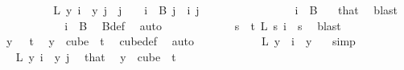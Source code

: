 \begin{isabellebody}
\isanewline
\isanewline
\ \ \ \ \ \ \isamarkupfalse%
\ \isamarkupfalse%
\ {\isachardoublequoteopen}{\isacharparenleft}{\kern0pt}{\isacharquery}{\kern0pt}L\ y{\isacharparenright}{\kern0pt}\ i\ {\isacharequal}{\kern0pt}\ y\ j{\isachardoublequoteclose}\ \ {\isachardoublequoteopen}j\ {\isacharless}{\kern0pt}\ {}{\isachardoublequoteclose}\ \ {\isachardoublequoteopen}i\ {\isasymin}\ B\ j{\isachardoublequoteclose}\ \ i\ j\isanewline
\ \ \ \ \ \ \isamarkupfalse%
{\isacharminus}{\kern0pt}\isanewline
\ \ \ \ \ \ \ \ \isamarkupfalse%
\ {\isachardoublequoteopen}i\ {\isasymin}\ B\ {}{\isachardoublequoteclose}\ \isamarkupfalse%
\ that\ \isamarkupfalse%
\ blast\isanewline
\ \ \ \ \ \ \ \ \isamarkupfalse%
\ \isamarkupfalse%
\ {\isachardoublequoteopen}i\ {\isasymin}\ {\isacharquery}{\kern0pt}B{}{\isachardoublequoteclose}\ \isamarkupfalse%
\ B{\isacharunderscore}{\kern0pt}def\ \isamarkupfalse%
\ auto\ \isanewline
\ \ \ \ \ \ \ \ \isamarkupfalse%
\ \isamarkupfalse%
\ {\isachardoublequoteopen}{\isacharparenleft}{\kern0pt}{\isasymforall}s\ {\isacharless}{\kern0pt}\ t{\isachardot}{\kern0pt}\ L\ s\ i\ {\isacharequal}{\kern0pt}\ s{\isacharparenright}{\kern0pt}{\isachardoublequoteclose}\ \isamarkupfalse%
\ blast\isanewline
\ \ \ \ \ \ \ \ \isamarkupfalse%
\ \isamarkupfalse%
\ {\isachardoublequoteopen}y\ {}\ {\isacharless}{\kern0pt}\ t{\isachardoublequoteclose}\ \isamarkupfalse%
\ {\isacartoucheopen}y\ {\isasymin}\ cube\ {}\ t{\isacartoucheclose}\ \isamarkupfalse%
\ cube{\isacharunderscore}{\kern0pt}def\ \isamarkupfalse%
\ auto\isanewline
\ \ \ \ \ \ \ \ \isamarkupfalse%
\ \isamarkupfalse%
\ {\isachardoublequoteopen}L\ {\isacharparenleft}{\kern0pt}y\ {}{\isacharparenright}{\kern0pt}\ i\ {\isacharequal}{\kern0pt}\ y\ {}{\isachardoublequoteclose}\ \isamarkupfalse%
\ simp\isanewline
\ \ \ \ \ \ \ \ \isamarkupfalse%
\ \isamarkupfalse%
\ {\isachardoublequoteopen}{\isacharquery}{\kern0pt}L\ y\ i\ {\isacharequal}{\kern0pt}\ y\ j{\isachardoublequoteclose}\ \isamarkupfalse%
\ that\ \isamarkupfalse%
\ {\isacartoucheopen}y\ {\isasymin}\ cube\ {}\ t{\isacartoucheclose}\ \isamarkupfalse%

\end{isabellebody}
